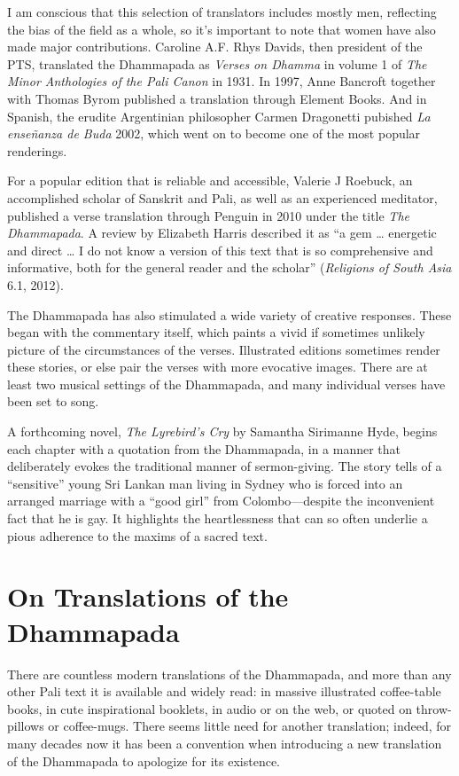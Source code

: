\documentclass[12pt,openany]{book}%
\begin{document}
I am conscious that this selection of translators includes mostly men, reflecting the bias of the field as a whole, so it’s important to note that women have also made major contributions. Caroline A.F. Rhys Davids, then president of the PTS,  translated the Dhammapada as \textit{Verses on Dhamma} in volume 1 of \textit{The Minor Anthologies of the Pali Canon} in 1931. In 1997, Anne Bancroft together with Thomas Byrom published a translation through Element Books. And in Spanish, the erudite Argentinian philosopher Carmen Dragonetti pubished \textit{La \textsanskrit{enseñanza} de Buda} 2002, which went on to become one of the most popular renderings.

For a popular edition that is reliable and accessible, Valerie J Roebuck, an accomplished scholar of Sanskrit and Pali, as well as an experienced meditator, published a verse translation through Penguin in 2010 under the title \textit{The Dhammapada}. A review by Elizabeth Harris described it as “a gem … energetic and direct … I do not know a version of this text that is so comprehensive and informative, both for the general reader and the scholar” (\textit{Religions of South Asia} 6.1, 2012).

The Dhammapada has also stimulated a wide variety of creative responses. These began with the commentary itself, which paints a vivid if sometimes unlikely picture of the circumstances of the verses. Illustrated editions sometimes render these stories, or else pair the verses with more evocative images. There are at least two musical settings of the Dhammapada, and many individual verses have been set to song.

A forthcoming novel, \textit{The Lyrebird’s Cry} by Samantha Sirimanne Hyde, begins each chapter with a quotation from the Dhammapada, in a manner that deliberately evokes the traditional manner of sermon-giving. The story tells of a “sensitive” young Sri Lankan man living in Sydney who is forced into an arranged marriage with a “good girl” from Colombo—despite the inconvenient fact that he is gay. It highlights the heartlessness that can so often underlie a pious adherence to the maxims of a sacred text.

\section*{On Translations of the Dhammapada}

There are countless modern translations of the Dhammapada, and more than any other Pali text it is available and widely read: in massive illustrated coffee-table books, in cute inspirational booklets, in audio or on the web, or quoted on throw-pillows or coffee-mugs. There seems little need for another translation; indeed, for many decades now it has been a convention when introducing a new translation of the Dhammapada to apologize for its existence.
\end{document}
